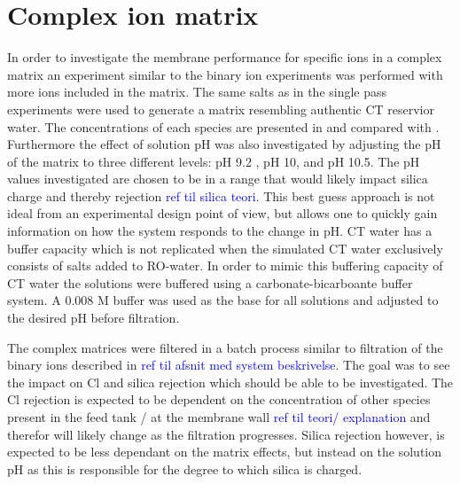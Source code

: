 \section{Complex ion matrix }
In order to investigate the membrane performance for specific ions in a complex matrix an experiment similar to the binary ion experiments was performed with more ions included in the matrix.
The same salts as in the single pass experiments were used to generate a matrix resembling authentic CT reservior water. 
The concentrations of each species are presented in  and compared with .
Furthermore the effect of solution pH was also investigated by adjusting the pH of the matrix to three different levels: pH 9.2 , pH 10, and pH 10.5. 
The pH values investigated are chosen to be in a range that would likely impact silica charge and thereby rejection \textcolor{blue}{ref til silica teori}.
This best guess approach is not ideal from an experimental design point of view, but allows one to quickly gain information on how the system responds to the change in pH.
CT water has a buffer capacity which is not replicated when the simulated CT water exclusively consists of salts added to RO-water.
In order to mimic this buffering capacity of CT water the solutions were buffered using a carbonate-bicarboante buffer system.
A 0.008 M buffer was used as the base for all solutions and adjusted to the desired pH before filtration. 

The complex matrices were filtered in a batch process similar to filtration of the binary ions described in \textcolor{blue}{ref til afsnit med system beskrivelse}.
The goal was to see the impact on Cl and silica rejection which should be able to be investigated.
The Cl rejection is expected to be dependent on the concentration of other species present in the feed tank / at the membrane wall \textcolor{blue}{ref til teori/ explanation} and therefor will likely change as the filtration progresses.
Silica rejection however, is expected to be less dependant on the matrix effects, but instead on the solution pH as this is responsible for the degree to which silica is charged.



